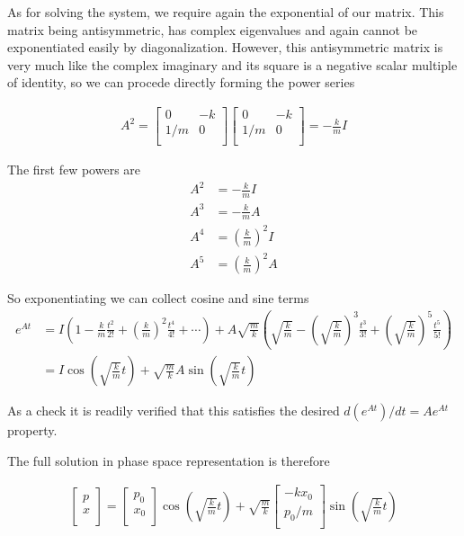 As for solving the system, we require again the exponential of our matrix.  This matrix being antisymmetric, has complex eigenvalues and again cannot be exponentiated easily by diagonalization.  However,  this antisymmetric matrix is very much like the complex imaginary and its square is a negative scalar multiple of identity, so we can procede directly forming the power series

\begin{align}\label{eqn:hamiltonian:woo7}
A^2 =
\begin{bmatrix}
0 & - k \\
1/m & 0 \\
\end{bmatrix}
\begin{bmatrix}
0 & - k \\
1/m & 0 \\
\end{bmatrix}
=
-\frac{k}{m} I
\end{align}

The first few powers are 
\begin{align}\label{eqn:hamiltonian:woo8}
A^2 &= -\frac{k}{m} I \\
A^3 &= -\frac{k}{m} A \\
A^4 &= \left(\frac{k}{m}\right)^2 I \\
A^5 &= \left(\frac{k}{m}\right)^2 A
\end{align}

So exponentiating we can collect cosine and sine terms
\begin{align*}
e^{At} 
&= I \left( 1 - \frac{k}{m} \frac{t^2}{2!} + \left( \frac{k}{m} \right)^2 \frac{t^4}{4!} + \cdots \right) 
+ A\sqrt{\frac{m}{k}} \left( \sqrt{\frac{k}{m}} - \left(\sqrt{\frac{k}{m}}\right)^3 \frac{t^3}{3!} + \left(\sqrt{\frac{k}{m}}\right)^5 \frac{t^5}{5!} \right) \\
&= 
I \cos\left(\sqrt{\frac{k}{m}} t\right) + \sqrt{\frac{m}{k}} A \sin\left(\sqrt{\frac{k}{m}} t\right)
\end{align*}

As a check it is readily verified that this satisfies the desired $d(e^{At})/dt = A e^{At}$ property.

The full solution in phase space representation is therefore

\begin{align}\label{eqn:hamiltonian:woo9}
\begin{bmatrix}
p \\
x \\
\end{bmatrix}
=
\begin{bmatrix}
p_0 \\
x_0 \\
\end{bmatrix}
\cos\left(\sqrt{\frac{k}{m}} t\right) 
+ \sqrt{\frac{m}{k}}
\begin{bmatrix}
-k x_0 \\
p_0/m \\
\end{bmatrix}
\sin\left(\sqrt{\frac{k}{m}} t\right)
\end{align}

